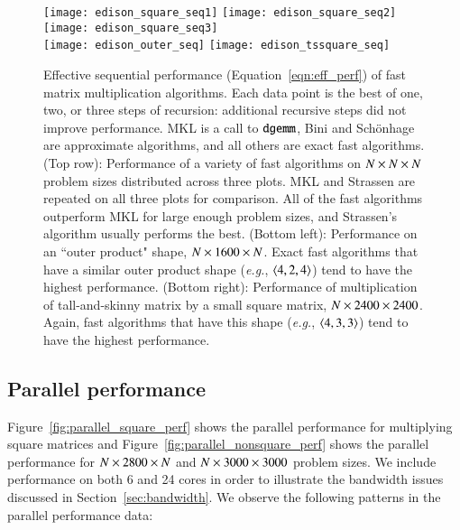 \documentclass[preprint]{sigplanconf}
\begin{document}
\begin{figure*}[tb]
\centering
\texttt{[image: edison\_square\_seq1]}
\texttt{[image: edison\_square\_seq2]}
\texttt{[image: edison\_square\_seq3]} \\
\texttt{[image: edison\_outer\_seq]}
\texttt{[image: edison\_tssquare\_seq]}
\caption{
Effective sequential performance (Equation~\eqref{eqn:eff_perf}) of fast matrix multiplication algorithms.
Each data point is the best of one, two, or three steps of recursion: additional recursive steps did not improve performance.
MKL is a call to $\texttt{dgemm}$,
Bini and Sch\"{o}nhage are approximate algorithms, 
and all others are exact fast algorithms.
(Top row):
Performance of a variety of fast algorithms on $N \times N \times N$ problem sizes distributed across three plots.
MKL and Strassen are repeated on all three plots for comparison.
All of the fast algorithms outperform MKL for large enough problem sizes, and Strassen's algorithm usually performs the best.
(Bottom left):
Performance on an ``outer product" shape, $N \times 1600 \times N$.
Exact fast algorithms that have a similar outer product shape (\emph{e.g.}, $\left\langle4, 2, 4\right\rangle$) tend to have the highest performance.
(Bottom right):
Performance of multiplication of tall-and-skinny matrix by a small square matrix, $N \times 2400 \times 2400$.
Again, fast algorithms that have this shape (\emph{e.g.}, $\left\langle4, 3, 3\right\rangle$) tend to have the highest performance.
}
\label{fig:sequential_perf}
\end{figure*}


\subsection{Parallel performance}
\label{sec:perf_parallel}

Figure~\ref{fig:parallel_square_perf} shows the parallel performance for multiplying square matrices and Figure~\ref{fig:parallel_nonsquare_perf} shows the parallel performance for $N \times 2800 \times N$ and $N \times 3000 \times 3000$ problem sizes.
We include performance on both 6 and 24 cores in order to illustrate the bandwidth issues discussed in Section~\ref{sec:bandwidth}.
We observe the following patterns in the parallel performance data:
\end{document}
